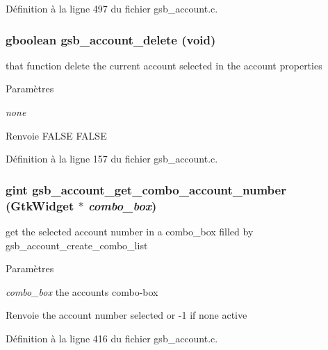 Définition à la ligne 497 du fichier gsb\_\-account.c.

\subsubsection[{gsb\_\-account\_\-delete}]{\setlength{\rightskip}{0pt plus 5cm}gboolean gsb\_\-account\_\-delete (void)}\label{gsb__account_8c_a7400463771b2b5905b261cb177c2524e}
that function delete the current account selected in the account properties 
\begin{DoxyParams}{Paramètres}
\item[{\em none}]\end{DoxyParams}
\begin{DoxyReturn}{Renvoie}
FALSE FALSE 
\end{DoxyReturn}


Définition à la ligne 157 du fichier gsb\_\-account.c.

\subsubsection[{gsb\_\-account\_\-get\_\-combo\_\-account\_\-number}]{\setlength{\rightskip}{0pt plus 5cm}gint gsb\_\-account\_\-get\_\-combo\_\-account\_\-number (GtkWidget $\ast$ {\em combo\_\-box})}\label{gsb__account_8c_a8c27c31186134dfd2a9ee5a1ca0b4d2d}
get the selected account number in a combo\_\-box filled by gsb\_\-account\_\-create\_\-combo\_\-list


\begin{DoxyParams}{Paramètres}
\item[{\em combo\_\-box}]the accounts combo-\/box\end{DoxyParams}
\begin{DoxyReturn}{Renvoie}
the account number selected or -\/1 if none active 
\end{DoxyReturn}


Définition à la ligne 416 du fichier gsb\_\-account.c.

